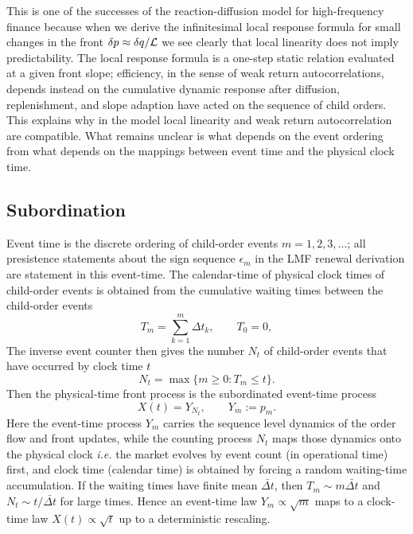 \documentclass[5p,final]{elsarticle}
\begin{document}
This is one of the successes of the reaction-diffusion model for high-frequency finance because when we derive the infinitesimal local response formula for small changes in the front $\delta p \approx \delta q / {\cal L}$ we see clearly that local linearity does not imply predictability. The local response formula is a one-step static relation evaluated at a given front slope; efficiency, in the sense of weak return autocorrelations, depends instead on the cumulative dynamic response after diffusion, replenishment, and slope adaption have acted on the sequence of child orders. This explains why in the model local linearity and weak return autocorrelation are compatible. What remains unclear is what depends on the event ordering from what depends on the mappings between event time and the physical clock time. 

\subsection{Subordination} \label{sec:subordination}


Event time is the discrete ordering of child-order events $m=1,2,3,\ldots$; all presistence statements about the sign sequence $\epsilon_m$ in the LMF renewal derivation are statement in this event-time. The calendar-time of physical clock times of child-order events is obtained from the cumulative waiting times between the child-order events
\begin{equation}
T_m=\sum_{k=1}^{m}\Delta t_k,
\qquad T_0=0,
\end{equation}
The inverse event counter then gives the number $N_t$ of child-order events that have occurred by clock time $t$
\begin{equation}
N_t=\max\{m\ge0:T_m\le t\}.
\end{equation}
Then the physical-time front process is the subordinated event-time process
\begin{equation}
X(t)=Y_{N_t},\qquad Y_m:=p_m.
\end{equation}
Here the event-time process $Y_m$ carries the sequence level dynamics of the order flow and front updates, while the counting process $N_t$ maps those dynamics onto the physical clock {\it i.e.} the market evolves by event count (in operational time) first, and clock time (calendar time) is obtained by forcing a random waiting-time accumulation. If the waiting times have finite mean $\bar{\Delta t}$, then $T_m\sim m\bar{\Delta t}$ and $N_t\sim t/\bar{\Delta t}$ for large times. Hence an event-time law $Y_m\propto \sqrt{m}$ maps to a clock-time law $X(t)\propto \sqrt{t}$ up to a deterministic rescaling. 
\end{document}
